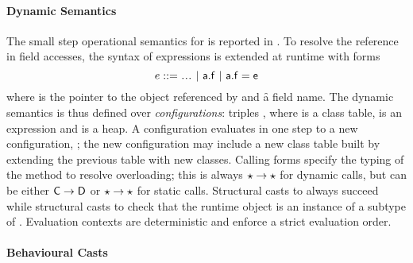 \documentclass[acmlarge, anonymous, authordraft]{acmart}
\newcommand{\FZ}[1]{\textbf{FZ: #1}}
\begin{document}
\paragraph{Dynamic Semantics}
The small  step operational semantics for \kafka is reported in .  To resolve the \this reference in field accesses, the syntax of expressions is extended at runtime with forms 
\[ e  ::= \dots \B \FReadR\a\f \B \FWriteR\a\f\e \]
where \a is the pointer to the object referenced by \this and \f a field name.
The dynamic semantics is thus defined over \emph{configurations}: triples \K\e\s, where \K is a class
table, \e is an expression and \s is a heap.  A configuration evaluates in one
step to a new configuration, \Reduce \K\e\s\Kp\ep\sp;  the new configuration may
include a new class table built by extending the previous table with new
classes.
%
Calling forms specify the
typing of the method to resolve overloading; this is always \(\star \to \star\) for dynamic calls, but can be either \({\sf{C}} \to {\sf{D}}\) or \(\star \to \star\) for  static calls.
Structural casts to \any always succeed
while structural casts to \C check that the runtime object is an instance of a
subtype of \C.  
Evaluation contexts are deterministic and enforce a strict evaluation order.

\paragraph{Behavioural Casts}
\end{document}
